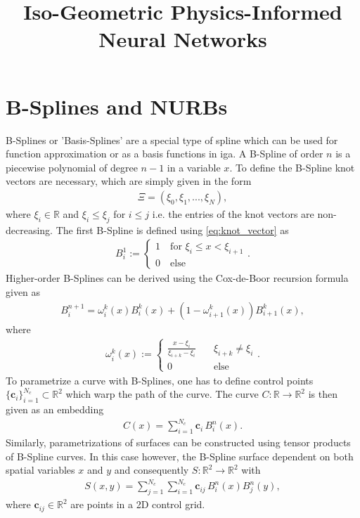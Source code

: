 \documentclass[12pt]{article}
\begin{document}
\title{Iso-Geometric Physics-Informed Neural Networks}
\maketitle
\section*{B-Splines and NURBs}
B-Splines or 'Basis-Splines' are a special type of spline which can be used for function approximation or as a basis functions in \gls{iga}.
A B-Spline of order $n$ is a piecewise polynomial of degree $n-1$ in a variable $x$.
To define the B-Spline knot vectors are necessary, which are simply given in the form
\begin{align}
\label{eq:knot_vector}
	\Xi = (\xi_0,\xi_1,...,\xi_N),
\end{align}
where $\xi_i\in\mathbb{R}$ and $\xi_i\leq\xi_j$ for $i\leq j$ i.e. the entries of the knot vectors are non-decreasing.
The first B-Spline is defined using \eqref{eq:knot_vector} as
\begin{align}
	B^{1}_i:=
	\begin{cases}
		1 \quad \text{for } \xi_i\leq x < \xi_{i+1} \\
		0 \quad \text{else}
	\end{cases}.
\end{align}
Higher-order B-Splines can be derived using the Cox-de-Boor recursion formula given as
\begin{align}
	B^{n+1}_i = \omega^k_i(x)B^k_i(x) + \left( 1- \omega^k_{i+1}(x) \right)B^k_{i+1}(x),
\end{align}
where
\begin{align}
	\omega^k_i(x):=
	\begin{cases}
		\frac{x-\xi_i}{\xi_{i+k}-\xi_i}\quad &\xi_{i+k}\neq \xi_i \\
		0 \quad &\text{else}
	\end{cases}.
\end{align}
To parametrize a curve with B-Splines, one has to define control points $\{\mathbf{c}_i\}_{i=1}^{N_c}\subset \mathbb{R}^2$ which warp the path of the curve.
The curve $C:\mathbb{R}\rightarrow \mathbb{R}^2$ is then given as an embedding
\begin{align}
\label{eq:curve}
	C(x) = \sum_{i=1}^{N_c}\mathbf{c}_i \,B_i^n(x).
\end{align} 
Similarly, parametrizations of surfaces can be constructed using tensor products of B-Spline curves.
In this case however, the B-Spline surface dependent on both spatial variables $x$ and $y$ and consequently $S:\mathbb{R}^2 \rightarrow \mathbb{R}^2$ with
\begin{align}
	S(x,y) = \sum_{j=1}^{N_c}\sum_{i=1}^{N_c}\mathbf{c}_{ij} \,B_i^n(x)B_j^n(y),
\end{align} 
where $\mathbf{c}_{ij}\in \mathbb{R}^2$ are points in a 2D control grid.
\end{document}
